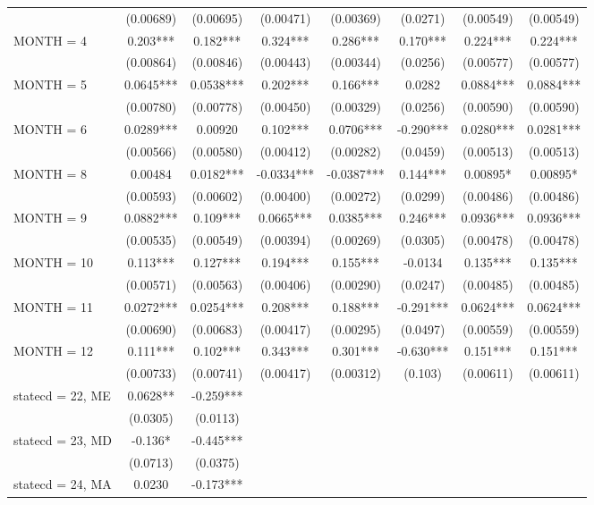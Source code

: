 \begin{tabular}{lccccccc}
 & (0.00689) & (0.00695) & (0.00471) & (0.00369) & (0.0271) & (0.00549) & (0.00549) \\
MONTH = 4 & 0.203*** & 0.182*** & 0.324*** & 0.286*** & 0.170*** & 0.224*** & 0.224*** \\
 & (0.00864) & (0.00846) & (0.00443) & (0.00344) & (0.0256) & (0.00577) & (0.00577) \\
MONTH = 5 & 0.0645*** & 0.0538*** & 0.202*** & 0.166*** & 0.0282 & 0.0884*** & 0.0884*** \\
 & (0.00780) & (0.00778) & (0.00450) & (0.00329) & (0.0256) & (0.00590) & (0.00590) \\
MONTH = 6 & 0.0289*** & 0.00920 & 0.102*** & 0.0706*** & -0.290*** & 0.0280*** & 0.0281*** \\
 & (0.00566) & (0.00580) & (0.00412) & (0.00282) & (0.0459) & (0.00513) & (0.00513) \\
MONTH = 8 & 0.00484 & 0.0182*** & -0.0334*** & -0.0387*** & 0.144*** & 0.00895* & 0.00895* \\
 & (0.00593) & (0.00602) & (0.00400) & (0.00272) & (0.0299) & (0.00486) & (0.00486) \\
MONTH = 9 & 0.0882*** & 0.109*** & 0.0665*** & 0.0385*** & 0.246*** & 0.0936*** & 0.0936*** \\
 & (0.00535) & (0.00549) & (0.00394) & (0.00269) & (0.0305) & (0.00478) & (0.00478) \\
MONTH = 10 & 0.113*** & 0.127*** & 0.194*** & 0.155*** & -0.0134 & 0.135*** & 0.135*** \\
 & (0.00571) & (0.00563) & (0.00406) & (0.00290) & (0.0247) & (0.00485) & (0.00485) \\
MONTH = 11 & 0.0272*** & 0.0254*** & 0.208*** & 0.188*** & -0.291*** & 0.0624*** & 0.0624*** \\
 & (0.00690) & (0.00683) & (0.00417) & (0.00295) & (0.0497) & (0.00559) & (0.00559) \\
MONTH = 12 & 0.111*** & 0.102*** & 0.343*** & 0.301*** & -0.630*** & 0.151*** & 0.151*** \\
 & (0.00733) & (0.00741) & (0.00417) & (0.00312) & (0.103) & (0.00611) & (0.00611) \\
statecd = 22, ME & 0.0628** & -0.259*** &  &  &  &  &  \\
 & (0.0305) & (0.0113) &  &  &  &  &  \\
statecd = 23, MD & -0.136* & -0.445*** &  &  &  &  &  \\
 & (0.0713) & (0.0375) &  &  &  &  &  \\
statecd = 24, MA & 0.0230 & -0.173*** &  &  &  &  &  \\

\end{tabular}
